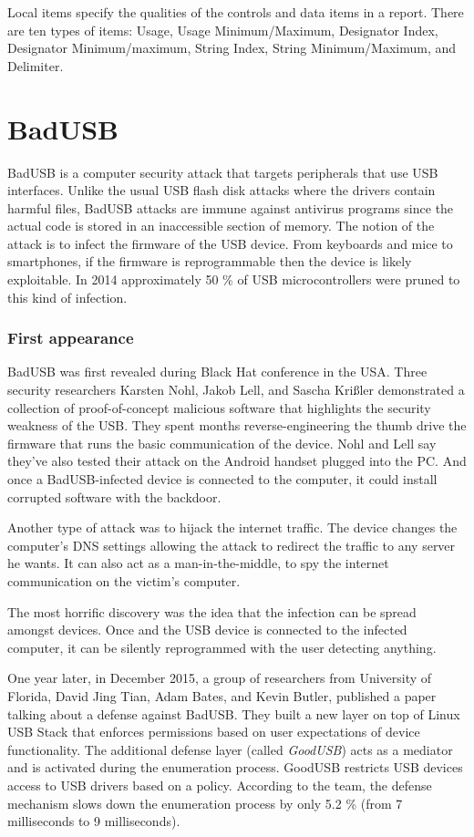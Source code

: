 Local items specify the qualities of the controls and data items in a report. There are ten types of items: Usage, Usage Minimum/Maximum, Designator Index, Designator Minimum/maximum, String Index, String Minimum/Maximum, and Delimiter. 
\chapter{BadUSB}
\label{badusb}

BadUSB is a computer security attack that targets peripherals that use USB interfaces. Unlike the usual USB flash disk attacks where the drivers contain harmful files, BadUSB attacks are immune against antivirus programs since the actual code is stored in an inaccessible section of memory. The notion of the attack is to infect the firmware of the USB device. From keyboards and mice to smartphones, if the firmware is reprogrammable then the device is likely exploitable. In 2014 approximately 50 \% of USB microcontrollers  were pruned to this kind of infection.

\subsection*{First appearance}
BadUSB was first revealed during Black Hat conference in the USA. Three security researchers Karsten Nohl, Jakob Lell, and Sascha Krißler demonstrated a collection of proof-of-concept malicious software that highlights the security weakness of the USB\cite{BlackHat}. They spent months reverse-engineering the thumb drive the firmware that runs the basic communication of the device. Nohl and Lell say they've also tested their attack on the Android handset plugged into the PC. And once a BadUSB-infected device is connected to the computer, it could install corrupted software with the backdoor. 

Another type of attack was to hijack the internet traffic. The device changes the computer's DNS settings allowing the attack to redirect the traffic to any server he wants. It can also act as a man-in-the-middle, to spy the internet communication on the victim's computer.

The most horrific discovery was the idea that the infection can be spread amongst devices. Once and the USB device is connected to the infected computer, it can be silently reprogrammed with the user detecting anything.

One year later, in December 2015, a group of researchers from University of Florida, David Jing Tian, Adam Bates, and Kevin Butler, published a paper talking about a defense against BadUSB. They built a new layer on top of Linux USB Stack that enforces permissions based on user expectations of device functionality. The additional defense layer (called \emph{GoodUSB}) acts as a mediator and is activated during the enumeration process. GoodUSB restricts USB devices access to USB drivers based on a policy. According to the team, the defense mechanism slows down the enumeration process by only 5.2 \% (from 7 milliseconds to 9 milliseconds)\cite{goodusb}.


